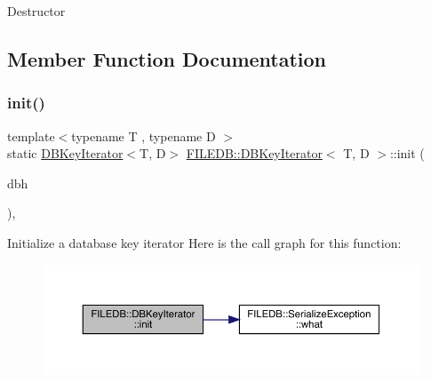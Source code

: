 Destructor 

\subsection{Member Function Documentation}
\mbox{\label{classFILEDB_1_1DBKeyIterator_af4a5e1eaeb6e5c491c5894f3e70f893c}} 
\subsubsection{\texorpdfstring{init()}{init()}\hspace{0.1cm}{\footnotesize\ttfamily [1/3]}}
{\footnotesize\ttfamily template$<$typename T , typename D $>$ \\
static \mbox{\hyperlink{classFILEDB_1_1DBKeyIterator}{D\+B\+Key\+Iterator}}$<$T, D$>$ \mbox{\hyperlink{classFILEDB_1_1DBKeyIterator}{F\+I\+L\+E\+D\+B\+::\+D\+B\+Key\+Iterator}}$<$ T, D $>$\+::init (\begin{DoxyParamCaption}\item[{\mbox{\hyperlink{adat-devel_2other__libs_2filedb_2filehash_2ffdb__db_8h_a0b27b956926453a7a8141ea8e10f0df8}{F\+F\+D\+B\+\_\+\+DB}} $\ast$}]{dbh }\end{DoxyParamCaption})\hspace{0.3cm}{\ttfamily [inline]}, {\ttfamily [static]}}

Initialize a database key iterator Here is the call graph for this function\+:
\nopagebreak
\begin{figure}[H]
\begin{center}
\leavevmode
\includegraphics[width=350pt]{d4/d89/classFILEDB_1_1DBKeyIterator_af4a5e1eaeb6e5c491c5894f3e70f893c_cgraph}
\end{center}
\end{figure}
\mbox{\label{classFILEDB_1_1DBKeyIterator_af4a5e1eaeb6e5c491c5894f3e70f893c}} 
